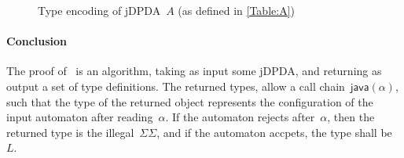 \begin{figure}[htbp]
  \caption{\label{Figure:A}Type encoding of jDPDA~$A$ (as defined in \cref{Table:A})}
\end{figure}

\paragraph*{Conclusion} The proof of~ is an algorithm, taking as input some jDPDA,
  and returning as output a set of \Java type definitions.
The returned types, allow a call chain~$\textsf{java}(\alpha)$,
  such that the type of the returned object represents the 
  configuration of the input automaton after reading~$\alpha$.
If the automaton rejects after~$\alpha$, then the returned type is the illegal~$\Sigma\Sigma$, 
  and if the automaton accpets, the type shall be~$L$.

